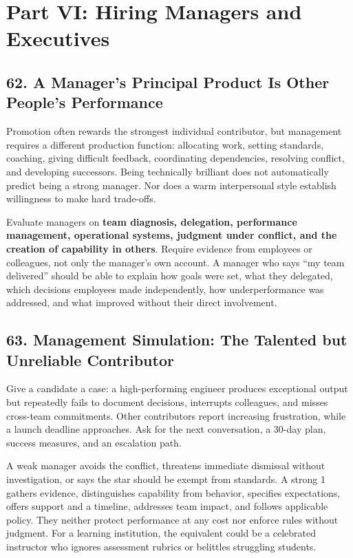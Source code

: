 \section*{Part VI: Hiring Managers and Executives}

\subsection*{62. A Manager's Principal Product Is Other People's Performance}

Promotion often rewards the strongest individual contributor, but management requires a different production function: allocating work, setting standards, coaching, giving difficult feedback, coordinating dependencies, resolving conflict, and developing successors. Being technically brilliant does not automatically predict being a strong manager. Nor does a warm interpersonal style establish willingness to make hard trade-offs.

Evaluate managers on \textbf{team diagnosis, delegation, performance management, operational systems, judgment under conflict, and the creation of capability in others}. Require evidence from employees or colleagues, not only the manager's own account. A manager who says ``my team delivered'' should be able to explain how goals were set, what they delegated, which decisions employees made independently, how underperformance was addressed, and what improved without their direct involvement.

\subsection*{63. Management Simulation: The Talented but Unreliable Contributor}

Give a candidate a case: a high-performing engineer produces exceptional output but repeatedly fails to document decisions, interrupts colleagues, and misses cross-team commitments. Other contributors report increasing frustration, while a launch deadline approaches. Ask for the next conversation, a 30-day plan, success measures, and an escalation path.

A weak manager avoids the conflict, threatens immediate dismissal without investigation, or says the star should be exempt from standards. A strong 1 gathers evidence, distinguishes capability from behavior, specifies expectations, offers support and a timeline, addresses team impact, and follows applicable policy. They neither protect performance at any cost nor enforce rules without judgment. For a learning institution, the equivalent could be a celebrated instructor who ignores assessment rubrics or belittles struggling students.

